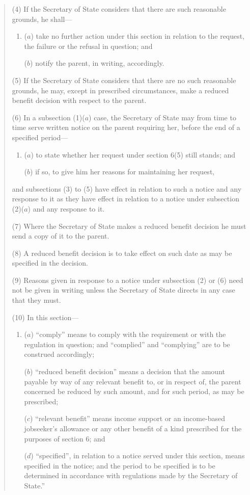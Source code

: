 \documentclass[12pt,a4paper]{article}
\begin{document}
\begin{quotation}
(4) If the Secretary of State considers that there are such reasonable grounds, he shall—
\begin{enumerate}\item[]
($a$) take no further action under this section in relation to the request, the failure or the refusal in question; and

($b$) notify the parent, in writing, accordingly.
\end{enumerate}

(5) If the Secretary of State considers that there are no such reasonable grounds, he may, except in prescribed circumstances, make a reduced benefit decision with respect to the parent.

(6) In a subsection (1)($a$)  case, the Secretary of State may from time to time serve written notice on the parent requiring her, before the end of a specified period—
\begin{enumerate}\item[]
($a$) to state whether her request under section 6(5)  still stands; and

($b$) if so, to give him her reasons for maintaining her request,
\end{enumerate}
and subsections (3)  to (5)  have effect in relation to such a notice and any response to it as they have effect in relation to a notice under subsection (2)($a$)  and any response to it.

(7) Where the Secretary of State makes a reduced benefit decision he must send a copy of it to the parent.

(8) A reduced benefit decision is to take effect on such date as may be specified in the decision.

(9) Reasons given in response to a notice under subsection (2)  or (6)  need not be given in writing unless the Secretary of State directs in any case that they must.

(10) In this section—
\begin{enumerate}\item[]
($a$) “comply” means to comply with the requirement or with the regulation in question; and “complied” and “complying” are to be construed accordingly;

($b$) “reduced benefit decision” means a decision that the amount payable by way of any relevant benefit to, or in respect of, the parent concerned be reduced by such amount, and for such period, as may be prescribed;

($c$) “relevant benefit” means income support or an income-based jobseeker’s allowance or any other benefit of a kind prescribed for the purposes of section 6; and

($d$) “specified”, in relation to a notice served under this section, means specified in the notice; and the period to be specified is to be determined in accordance with regulations made by the Secretary of State.”
\end{enumerate}
\end{quotation}
\end{document}
